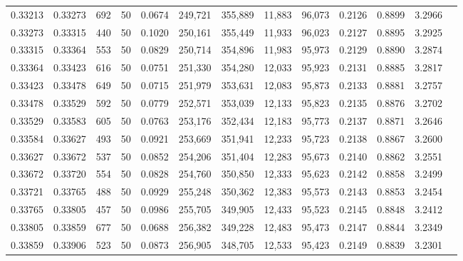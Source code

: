 \begin{tabular}{rrrrrrrrrrrrr}
0.33213 & 0.33273 &   692 &  50 &                                     0.0674 & 249,721 & 355,889 &  11,883 &  96,073 & 0.2126 & 0.8899 & 3.2966 \\
0.33273 & 0.33315 &   440 &  50 &                                     0.1020 & 250,161 & 355,449 &  11,933 &  96,023 & 0.2127 & 0.8895 & 3.2925 \\
0.33315 & 0.33364 &   553 &  50 &                                     0.0829 & 250,714 & 354,896 &  11,983 &  95,973 & 0.2129 & 0.8890 & 3.2874 \\
0.33364 & 0.33423 &   616 &  50 &                                     0.0751 & 251,330 & 354,280 &  12,033 &  95,923 & 0.2131 & 0.8885 & 3.2817 \\
0.33423 & 0.33478 &   649 &  50 &                                     0.0715 & 251,979 & 353,631 &  12,083 &  95,873 & 0.2133 & 0.8881 & 3.2757 \\
0.33478 & 0.33529 &   592 &  50 &                                     0.0779 & 252,571 & 353,039 &  12,133 &  95,823 & 0.2135 & 0.8876 & 3.2702 \\
0.33529 & 0.33583 &   605 &  50 &                                     0.0763 & 253,176 & 352,434 &  12,183 &  95,773 & 0.2137 & 0.8871 & 3.2646 \\
0.33584 & 0.33627 &   493 &  50 &                                     0.0921 & 253,669 & 351,941 &  12,233 &  95,723 & 0.2138 & 0.8867 & 3.2600 \\
0.33627 & 0.33672 &   537 &  50 &                                     0.0852 & 254,206 & 351,404 &  12,283 &  95,673 & 0.2140 & 0.8862 & 3.2551 \\
0.33672 & 0.33720 &   554 &  50 &                                     0.0828 & 254,760 & 350,850 &  12,333 &  95,623 & 0.2142 & 0.8858 & 3.2499 \\
0.33721 & 0.33765 &   488 &  50 &                                     0.0929 & 255,248 & 350,362 &  12,383 &  95,573 & 0.2143 & 0.8853 & 3.2454 \\
0.33765 & 0.33805 &   457 &  50 &                                     0.0986 & 255,705 & 349,905 &  12,433 &  95,523 & 0.2145 & 0.8848 & 3.2412 \\
0.33805 & 0.33859 &   677 &  50 &                                     0.0688 & 256,382 & 349,228 &  12,483 &  95,473 & 0.2147 & 0.8844 & 3.2349 \\
0.33859 & 0.33906 &   523 &  50 &                                     0.0873 & 256,905 & 348,705 &  12,533 &  95,423 & 0.2149 & 0.8839 & 3.2301 \\

\end{tabular}
